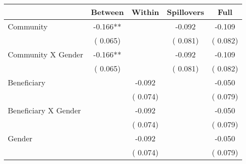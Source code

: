 
\begin{tabular}{l*{4}{c}}\hline&\multicolumn{1}{c}{Between}&\multicolumn{1}{c}{Within}&\multicolumn{1}{c}{Spillovers}&\multicolumn{1}{c}{Full}\\ \hline
 Community                                     &             -0.166**      &                                               &       -0.092 &        -0.109                            \\ 
                                                       &        (       0.065)           &                                       &       (       0.081)     &      (       0.082)                                           \\ 
 Community X Gender            &             -0.166**      &                                               &       -0.092 &        -0.109                            \\ 
                                                       &        (       0.065)           &                                       &       (       0.081)     &      (       0.082)                                           \\ 
 Beneficiary                           &                                               &       -0.092    &                                &            -0.050                            \\ 
                                                       &                                               & (       0.074)                  &                                        &      (       0.079)                                           \\ 
 Beneficiary X Gender          &                                               &       -0.092    &                                &            -0.050                            \\ 
                                                       &                                               & (       0.074)                  &                                        &      (       0.079)                                           \\ 
 Gender                                        &                              &       -0.092    &                                &            -0.050                            \\ 
                                                       &                                               & (       0.074)                  &                                        &      (       0.079)                                           \\ 

\end{tabular}
